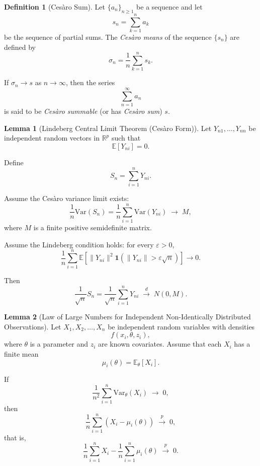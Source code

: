 \documentclass[11pt]{article}
\theoremstyle{definition}
\newtheorem{defn}{Definition}[section]
\newtheorem{lemma}{Lemma}[section]
\begin{document}
\begin{defn}[Cesàro Sum]
Let $\{a_n\}_{n\ge1}$ be a sequence and let
\[
s_n=\sum_{k=1}^n a_k
\]
be the sequence of partial sums.
The \emph{Cesàro means} of the sequence $\{s_n\}$ are defined by
\[
\sigma_n
=
\frac{1}{n}\sum_{k=1}^n s_k .
\]

If $\sigma_n \to s$ as $n\to\infty$, then the series
\[
\sum_{n=1}^{\infty} a_n
\]
is said to be \emph{Cesàro summable} (or has \emph{Cesàro sum}) $s$.
\end{defn}
\begin{lemma}[Lindeberg Central Limit Theorem (Cesàro Form)]
Let $Y_{n1},\dots,Y_{nn}$ be independent random vectors in $\mathbb{R}^p$
such that
\[
\mathbb{E}[Y_{ni}] = 0 .
\]

Define
\[
S_n = \sum_{i=1}^n Y_{ni}.
\]

Assume the Cesàro variance limit exists:
\[
\frac{1}{n}\mathrm{Var}(S_n)
=
\frac{1}{n}\sum_{i=1}^n \mathrm{Var}(Y_{ni})
\;\longrightarrow\;
M ,
\]
where $M$ is a finite positive semidefinite matrix.

Assume the Lindeberg condition holds: for every $\varepsilon>0$,
\[
\frac{1}{n}
\sum_{i=1}^n
\mathbb{E}\!\left[
\|Y_{ni}\|^2
\mathbf{1}\!\left(
\|Y_{ni}\|>\varepsilon\sqrt{n}
\right)
\right]
\longrightarrow 0 .
\]

Then
\[
\frac{1}{\sqrt{n}}S_n
=
\frac{1}{\sqrt{n}}\sum_{i=1}^n Y_{ni}
\;\xrightarrow{d}\;
N(0,M).
\]
\end{lemma}
\begin{lemma}[Law of Large Numbers for Independent Non-Identically Distributed Observations]
Let $X_1,X_2,\dots,X_n$ be independent random variables with densities
\[
f(x_i,\theta,z_i),
\]
where $\theta$ is a parameter and $z_i$ are known covariates. Assume that each $X_i$ has a finite mean
\[
\mu_i(\theta)=\mathbb{E}_\theta[X_i].
\]

If
\[
\frac{1}{n^2}\sum_{i=1}^n \mathrm{Var}_\theta(X_i) \;\longrightarrow\; 0,
\]
then
\[
\frac{1}{n}\sum_{i=1}^n \left(X_i-\mu_i(\theta)\right)
\;\xrightarrow{p}\; 0,
\]
that is,
\[
\frac{1}{n}\sum_{i=1}^n X_i
-
\frac{1}{n}\sum_{i=1}^n \mu_i(\theta)
\;\xrightarrow{p}\; 0 .
\]
\end{lemma}
\end{document}
